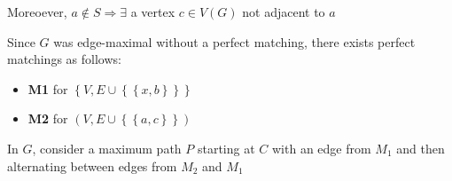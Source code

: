 \begin{prf}
\begin{itemize}
    Moreoever, $a\not\in S\Rightarrow \exists$ a vertex $c\in V(G)$ not adjacent to $a$\par
    Since $G$ was edge-maximal without a perfect matching, there exists perfect matchings as follows:\par
    \begin{itemize}
    \item\textbf{M1} for $\left\{V,E\cup\left\{\left\{x,b\right\}\right\}\right\}$\par
    \item\textbf{M2} for $(V,E\cup\left\{\left\{a,c\right\}\right\})$
    \end{itemize}
  \end{itemize}
  \par\bigskip
  In $G$, consider a maximum path $P$ starting at $C$ with an edge from $M_1$ and then alternating between edges from $M_2$ and $M_1$
\end{prf}

